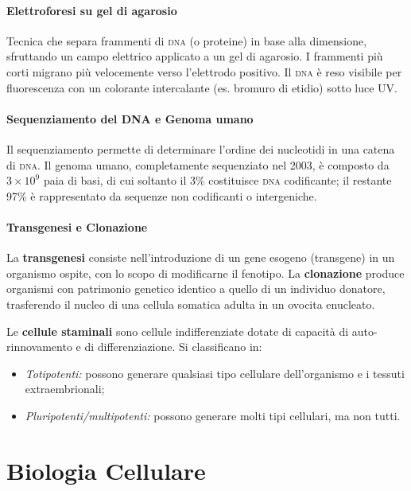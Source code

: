 \documentclass[11pt,a4paper,openright,twoside]{book}
\theoremstyle{definition}
\theoremstyle{plain}
\theoremstyle{remark}
\newcommand{\dna}{\textsc{dna}}
\begin{document}
\subsubsection{Elettroforesi su gel di agarosio}

Tecnica che separa frammenti di \dna{} (o proteine) in base alla dimensione, sfruttando un campo elettrico applicato a un gel di agarosio. I frammenti più corti migrano più velocemente verso l'elettrodo positivo. Il \dna{} è reso visibile per fluorescenza con un colorante intercalante (es. bromuro di etidio) sotto luce UV.

\subsubsection{Sequenziamento del DNA e Genoma umano}

Il sequenziamento permette di determinare l'ordine dei nucleotidi in una catena di \dna. Il genoma umano, completamente sequenziato nel 2003, è composto da $3 \times 10^9$ paia di basi, di cui soltanto il 3\% costituisce \dna{} codificante; il restante 97\% è rappresentato da sequenze non codificanti o intergeniche.

\subsubsection{Transgenesi e Clonazione}

La \textbf{transgenesi} consiste nell'introduzione di un gene esogeno (transgene) in un organismo ospite, con lo scopo di modificarne il fenotipo. La \textbf{clonazione} produce organismi con patrimonio genetico identico a quello di un individuo donatore, trasferendo il nucleo di una cellula somatica adulta in un ovocita enucleato.

Le \textbf{cellule staminali} sono cellule indifferenziate dotate di capacità di auto-rinnovamento e di differenziazione. Si classificano in:
\begin{itemize}
  \item \textit{Totipotenti:} possono generare qualsiasi tipo cellulare dell'organismo e i tessuti extraembrionali;
  \item \textit{Pluripotenti/multipotenti:} possono generare molti tipi cellulari, ma non tutti.
\end{itemize}

\chapter{Biologia Cellulare}
\end{document}
